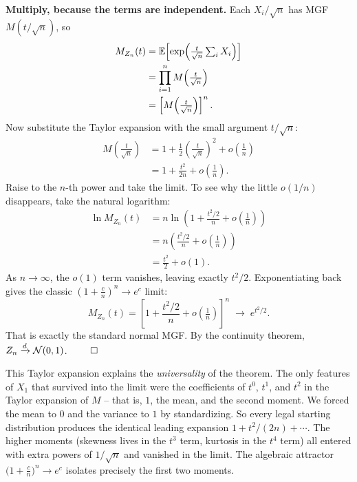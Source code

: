 \textbf{Multiply, because the terms are independent.} Each $X_i / \sqrt n$ has MGF
$M(t/\sqrt n)$, so
\begin{align*}
  M_{Z_n}(t) &= \operatorname{\mathbb{E}}\!\left[ \exp\!\Big( \tfrac{t}{\sqrt n}\textstyle\sum_i X_i \Big) \right] \\
             &= \prod_{i=1}^n M\!\left( \tfrac{t}{\sqrt n} \right) \\
             &= \left[ M\!\left( \tfrac{t}{\sqrt n} \right) \right]^{n}.
\end{align*}
Now substitute the Taylor expansion with the small argument $t/\sqrt n$:
\begin{align*}
  M\!\left( \tfrac{t}{\sqrt n} \right)
   &= 1 + \frac{1}{2}\!\left(\frac{t}{\sqrt n}\right)^{\!2} + o\!\left(\frac{1}{n}\right) \\
   &= 1 + \frac{t^2}{2n} + o\!\left(\frac{1}{n}\right).
\end{align*}
Raise to the $n$-th power and take the limit. To see why the little $o(1/n)$ disappears,
take the natural logarithm:
\begin{align*}
  \ln M_{Z_n}(t) &= n \ln\!\left( 1 + \frac{t^2/2}{n} + o\!\left(\tfrac1n\right) \right) \\
                 &= n \left( \frac{t^2/2}{n} + o\!\left(\tfrac1n\right) \right) \\
                 &= \frac{t^2}{2} + o(1).
\end{align*}
As $n \to \infty$, the $o(1)$ term vanishes, leaving exactly $t^2/2$. Exponentiating back gives
the classic $\left(1 + \frac{c}{n}\right)^n \to e^{c}$ limit:
\[
  M_{Z_n}(t) = \left[ 1 + \frac{t^2/2}{n} + o\!\left(\tfrac1n\right) \right]^{n}
             \;\longrightarrow\; e^{t^2/2}.
\]
That is exactly the standard normal MGF. By the continuity theorem,
$Z_n \xrightarrow{d} \mathcal{N}(0,1)$. $\qed$

\begin{whybox}
This Taylor expansion explains the \emph{universality} of the theorem. The
only features of $X_1$ that survived into the limit were the coefficients of $t^0$,
$t^1$, and $t^2$ in the Taylor expansion of $M$ -- that is, $1$, the mean, and the
second moment. We forced the mean to $0$ and the variance to $1$ by standardizing. So
every legal starting distribution produces the identical leading expansion
$1 + t^2/(2n) + \cdots$. The higher moments (skewness lives in the $t^3$ term, kurtosis
in the $t^4$ term) all entered with extra powers of $1/\sqrt n$ and vanished in
the limit. The algebraic attractor $\big(1 + \tfrac{c}{n}\big)^n \to e^c$ isolates
precisely the first two moments.
\end{whybox}

